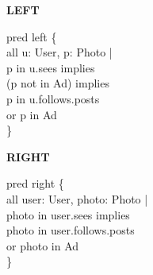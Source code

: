 \begin{figure}[t]
\centering
\scriptsize
\setlength{\fboxsep}{4pt}


\vspace{4pt}

\begin{minipage}[t]{0.47\linewidth}
\raggedright
\textbf{LEFT}\par
\ttfamily
pred left \{\\
\hspace*{1em}all u: User, p: Photo |\\
\hspace*{2em}p in u.sees implies\\
\hspace*{3em}(p not in Ad) implies\\
\hspace*{4em}p in u.follows.posts\\
\hspace*{5em}or p in Ad\\
\}
\end{minipage}
\hfill
\begin{minipage}[t]{0.47\linewidth}
\raggedright
\textbf{RIGHT}\par
\ttfamily
pred right \{\\
\hspace*{1em}all user: User, photo: Photo |\\
\hspace*{2em}photo in user.sees implies\\
\hspace*{3em}photo in user.follows.posts\\
\hspace*{4em}or photo in Ad\\
\}
\end{minipage}


\end{figure}
